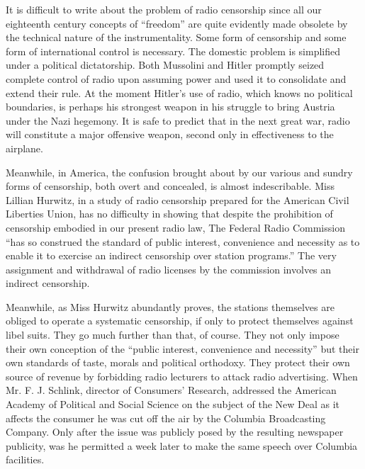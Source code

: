 It is difficult to write about the problem of radio censorship since all
our eighteenth century concepts of ``freedom'' are quite evidently made
obsolete by the technical nature of the instrumentality. Some form of
censorship and some form of international control is necessary. The
domestic problem is simplified under a political dictatorship. Both
Mussolini and Hitler promptly seized complete control of radio upon
assuming power and used it to consolidate and extend their rule. At the
moment Hitler's use of radio, which knows no political boundaries, is
perhaps his strongest weapon in his struggle to bring Austria under the
Nazi hegemony. It is safe to predict that in the next great war, radio
will constitute a major offensive weapon, second only in effectiveness
to the airplane.

Meanwhile, in America, the confusion brought about by our various and
sundry forms of censorship, both overt and concealed, is almost
indescribable. Miss Lillian Hurwitz, in a study of radio censorship
prepared for the American Civil Liberties Union, has no difficulty in
showing that despite the prohibition of censorship embodied in our
present radio law, The Federal Radio Commission ``has so construed the
standard of public interest, convenience and necessity as to enable it
to exercise an indirect censorship over station programs.'' The very
assignment and withdrawal of radio licenses by the commission involves
an indirect censorship.

Meanwhile, as Miss Hurwitz abundantly proves, the stations themselves
are obliged to operate a systematic censorship, if only to protect
themselves against libel suits. They go much further than that, of
course. They not only impose their own conception of the ``public
interest, convenience and necessity'' but their own standards of taste,
morals and political orthodoxy. They protect their own source of revenue
by forbidding radio lecturers to attack radio advertising. When Mr. F.
J. Schlink, director of Consumers' Research, addressed the American
Academy of Political and Social Science on the subject of the New Deal
as it affects the consumer he was cut off the air by the Columbia
Broadcasting Company. Only after the issue was publicly posed by the
resulting newspaper publicity, was he permitted a week later to make the
same speech over Columbia facilities.

